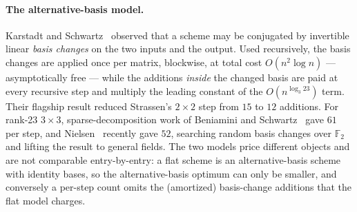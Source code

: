 \documentclass[11pt]{article}
\theoremstyle{definition}
\theoremstyle{remark}
\newcommand{\F}{\mathbb{F}}
\begin{document}
\paragraph{The alternative-basis model.}  Karstadt and
Schwartz~\cite{KS20} observed that a scheme may be conjugated by
invertible linear \emph{basis changes} on the two inputs and the
output.  Used recursively, the basis changes are applied once per
matrix, blockwise, at total cost $O(n^2\log n)$ --- asymptotically
free --- while the additions \emph{inside} the changed basis are paid
at every recursive step and multiply the leading constant of the
$O(n^{\log_3 23})$ term.  Their flagship result reduced Strassen's
$2\times2$ step from $15$ to $12$ additions.  For rank-23 $3\times3$,
sparse-decomposition work of Beniamini and Schwartz~\cite{BS19} gave
$61$ per step, and Nielsen~\cite{Nielsen26} recently gave $52$,
searching random basis changes over $\F_2$ and lifting the result to
general fields.  The two models price different objects and are not
comparable entry-by-entry: a flat scheme is an alternative-basis
scheme with identity bases, so the alternative-basis optimum can only
be smaller, and conversely a per-step count omits the (amortized)
basis-change additions that the flat model charges.
\end{document}
